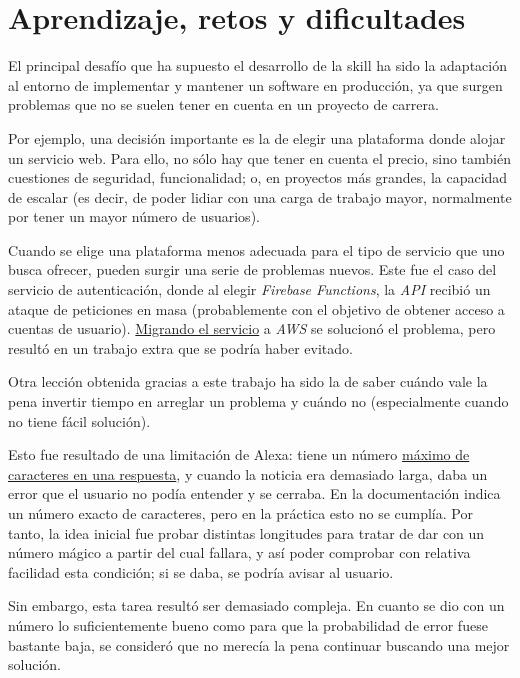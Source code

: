 \documentclass[11pt,spanish,listoffigures,listoftables,table,hyphens,dvipsnames]{tfgetsinf}
\begin{document}
\section{Aprendizaje, retos y dificultades}

El principal desafío que ha supuesto el desarrollo de la skill ha sido la adaptación al entorno de implementar y mantener un software en producción, ya que surgen problemas que no se suelen tener en cuenta en un proyecto de carrera.

Por ejemplo, una decisión importante es la de elegir una plataforma donde alojar un servicio web. Para ello, no sólo hay que tener en cuenta el precio, sino también cuestiones de seguridad, funcionalidad; o, en proyectos más grandes, la capacidad de escalar (es decir, de poder lidiar con una carga de trabajo mayor, normalmente por tener un mayor número de usuarios).

Cuando se elige una plataforma menos adecuada para el tipo de servicio que uno busca ofrecer, pueden surgir una serie de problemas nuevos. Este fue el caso del servicio de autenticación, donde al elegir \emph{Firebase Functions}, la \emph{API} recibió un ataque de peticiones en masa (probablemente con el objetivo de obtener acceso a cuentas de usuario). \hyperref[seccion:migracion-auth]{Migrando el servicio} a \emph{AWS} se solucionó el problema, pero resultó en un trabajo extra que se podría haber evitado.

Otra lección obtenida gracias a este trabajo ha sido la de saber cuándo vale la pena invertir tiempo en arreglar un problema y cuándo no (especialmente cuando no tiene fácil solución).

Esto fue resultado de una limitación de Alexa: tiene un número \hyperref[seccion:limite-caracteres]{máximo de caracteres en una respuesta}, y cuando la noticia era demasiado larga, daba un error que el usuario no podía entender y se cerraba. En la documentación indica un número exacto de caracteres, pero en la práctica esto no se cumplía. Por tanto, la idea inicial fue probar distintas longitudes para tratar de dar con un número mágico a partir del cual fallara, y así poder comprobar con relativa facilidad esta condición; si se daba, se podría avisar al usuario.

Sin embargo, esta tarea resultó ser demasiado compleja. En cuanto se dio con un número lo suficientemente bueno como para que la probabilidad de error fuese bastante baja, se consideró que no merecía la pena continuar buscando una mejor solución.
\end{document}
